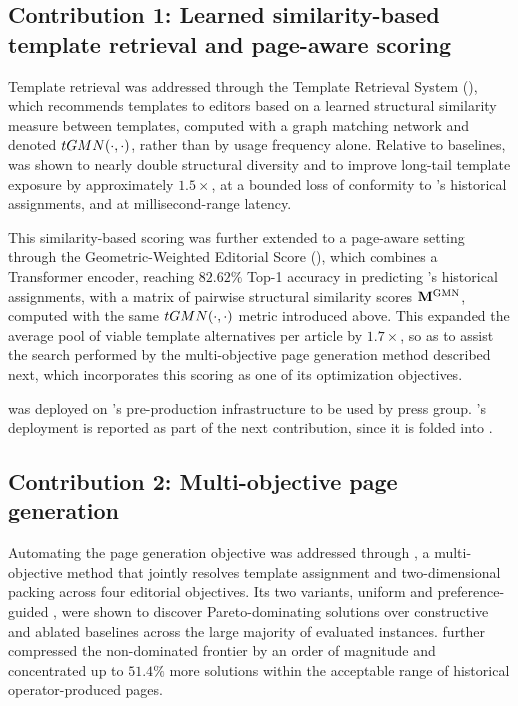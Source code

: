 \subsection*{Contribution 1: Learned similarity-based template retrieval and page-aware scoring}
Template retrieval was addressed through the Template Retrieval System (\trs), which recommends templates to editors based on a learned structural similarity measure between templates, computed with a graph matching network and denoted $tGMN(\cdot, \cdot)$, rather than by usage frequency alone. Relative to baselines, \trs was shown to nearly double structural diversity and to improve long-tail template exposure by approximately $1.5\times$, at a bounded loss of conformity to \melody's historical assignments, and at millisecond-range latency.

This similarity-based scoring was further extended to a page-aware setting through the Geometric-Weighted Editorial Score (\neuralmethod), which combines a Transformer encoder, reaching $82.62\%$ Top-1 accuracy in predicting \melody's historical assignments, with a matrix of pairwise structural similarity scores $\mathbf{M}^{\textrm{GMN}}$, computed with the same $tGMN(\cdot, \cdot)$ metric introduced above. This expanded the average pool of viable template alternatives per article by $1.7\times$, so as to assist the search performed by the multi-objective page generation method described next, which incorporates this scoring as one of its optimization objectives.

\begin{graybox}
\trs was deployed on \melody's pre-production infrastructure to be used by \publihebdos press group. \neuralmethod's deployment is reported as part of the next contribution, since it is folded into \methodNameGeneral.
\end{graybox}

\subsection*{Contribution 2: Multi-objective page generation}

Automating the page generation objective was addressed through \methodNameGeneral, a multi-objective method that jointly resolves template assignment and two-dimensional packing across four editorial objectives. Its two variants, uniform \methodNameUniform and preference-guided \methodName, were shown to discover Pareto-dominating solutions over constructive and ablated baselines across the large majority of evaluated instances.
\methodName further compressed the non-dominated frontier by an order of magnitude and concentrated up to $51.4\%$ more solutions within the acceptable range of historical operator-produced pages.

